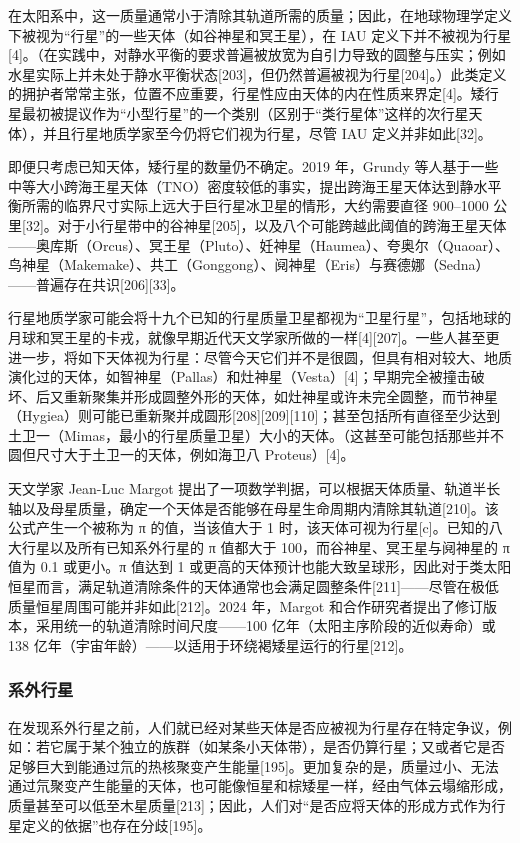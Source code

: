 在太阳系中，这一质量通常小于清除其轨道所需的质量；因此，在地球物理学定义下被视为“行星”的一些天体（如谷神星和冥王星），在 IAU 定义下并不被视为行星[4]。（在实践中，对静水平衡的要求普遍被放宽为自引力导致的圆整与压实；例如水星实际上并未处于静水平衡状态[203]，但仍然普遍被视为行星[204]。）此类定义的拥护者常常主张，位置不应重要，行星性应由天体的内在性质来界定[4]。矮行星最初被提议作为“小型行星”的一个类别（区别于“类行星体”这样的次行星天体），并且行星地质学家至今仍将它们视为行星，尽管 IAU 定义并非如此[32]。

即便只考虑已知天体，矮行星的数量仍不确定。2019 年，Grundy 等人基于一些中等大小跨海王星天体（TNO）密度较低的事实，提出跨海王星天体达到静水平衡所需的临界尺寸实际上远大于巨行星冰卫星的情形，大约需要直径 900–1000 公里[32]。对于小行星带中的谷神星[205]，以及八个可能跨越此阈值的跨海王星天体——奥库斯（Orcus）、冥王星（Pluto）、妊神星（Haumea）、夸奥尔（Quaoar）、鸟神星（Makemake）、共工（Gonggong）、阋神星（Eris）与赛德娜（Sedna）——普遍存在共识[206][33]。

行星地质学家可能会将十九个已知的行星质量卫星都视为“卫星行星”，包括地球的月球和冥王星的卡戎，就像早期近代天文学家所做的一样[4][207]。一些人甚至更进一步，将如下天体视为行星：尽管今天它们并不是很圆，但具有相对较大、地质演化过的天体，如智神星（Pallas）和灶神星（Vesta）[4]；早期完全被撞击破坏、后又重新聚集并形成圆整外形的天体，如灶神星或许未完全圆整，而节神星（Hygiea）则可能已重新聚并成圆形[208][209][110]；甚至包括所有直径至少达到土卫一（Mimas，最小的行星质量卫星）大小的天体。（这甚至可能包括那些并不圆但尺寸大于土卫一的天体，例如海卫八 Proteus）[4]。

天文学家 Jean-Luc Margot 提出了一项数学判据，可以根据天体质量、轨道半长轴以及母星质量，确定一个天体是否能够在母星生命周期内清除其轨道[210]。该公式产生一个被称为 π 的值，当该值大于 1 时，该天体可视为行星[c]。已知的八大行星以及所有已知系外行星的 π 值都大于 100，而谷神星、冥王星与阋神星的 π 值为 0.1 或更小。π 值达到 1 或更高的天体预计也能大致呈球形，因此对于类太阳恒星而言，满足轨道清除条件的天体通常也会满足圆整条件[211]——尽管在极低质量恒星周围可能并非如此[212]。2024 年，Margot 和合作研究者提出了修订版本，采用统一的轨道清除时间尺度——100 亿年（太阳主序阶段的近似寿命）或 138 亿年（宇宙年龄）——以适用于环绕褐矮星运行的行星[212]。
\subsubsection{系外行星}
在发现系外行星之前，人们就已经对某些天体是否应被视为行星存在特定争议，例如：若它属于某个独立的族群（如某条小天体带），是否仍算行星；又或者它是否足够巨大到能通过氘的热核聚变产生能量[195]。更加复杂的是，质量过小、无法通过氘聚变产生能量的天体，也可能像恒星和棕矮星一样，经由气体云塌缩形成，质量甚至可以低至木星质量[213]；因此，人们对“是否应将天体的形成方式作为行星定义的依据”也存在分歧[195]。


